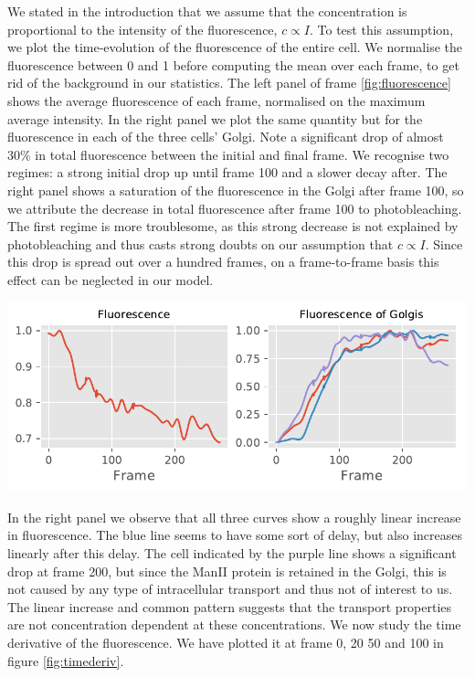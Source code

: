 \documentclass{Dissertate}
\let\origfigure\figure
\let\endorigfigure\endfigure
\renewenvironment{figure}[1][2] {
    \expandafter\origfigure\expandafter[H]
} {
    \endorigfigure
}
\begin{document}
We stated in the introduction that we assume that the concentration is proportional to the intensity of the fluorescence, $c\propto I$. To test this assumption, we plot the time-evolution of the fluorescence of the entire cell. We normalise the fluorescence between 0 and 1 before computing the mean over each frame, to get rid of the background in our statistics. The left panel of frame \ref{fig:fluorescence} shows the average fluorescence of each frame, normalised on the maximum average intensity. In the right panel we plot the same quantity but for the fluorescence in each of the three cells' Golgi. Note a significant drop of almost \(30\%\) in total fluorescence between the initial and final frame. We recognise two regimes: a strong initial drop up until frame 100 and a slower decay after. The right panel shows a saturation of the fluorescence in the Golgi after frame 100, so we attribute the decrease in total fluorescence after frame 100 to photobleaching. 
The first regime is more troublesome, as this strong decrease is not explained by photobleaching and thus casts strong doubts on our assumption that $c \propto I$. Since this drop is spread out over a hundred frames, on a frame-to-frame basis this effect can be neglected in our model.

\begin{figure}
	\centering
	\label{fig:fluorescence}
	\includegraphics{source/figures/pdf/general_fluorescence.pdf}
	\caption{\textbf{Left panel:} Normalised total fluorescence per frame. \textbf{Normalised fluorescence in each of the three cells' Golgi. }}
\end{figure}

In the right panel we observe that all three curves show a roughly linear increase in fluorescence. The blue line seems to have some sort of delay, but also increases linearly after this delay. The cell indicated by the purple line shows a significant drop at frame 200, but
since the ManII protein is retained in the Golgi, this is not caused by any
type of intracellular transport and thus not of interest to us. The
linear increase and common pattern suggests that the transport
properties are not concentration dependent at these concentrations. We now study the time derivative of the fluorescence. We have plotted it at frame 0, 20 50 and 100 in figure \ref{fig:timederiv}.
\end{document}
